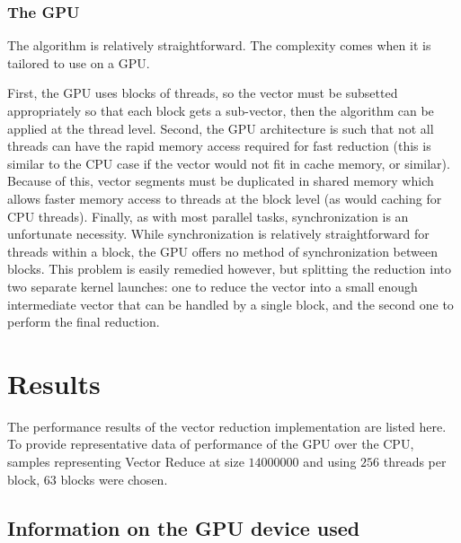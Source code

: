 \documentclass{article}
\begin{document}
\subsubsection{The GPU}
The algorithm is relatively straightforward. The complexity comes when it is tailored to use on a GPU.

First, the GPU uses blocks of threads, so the vector must be subsetted appropriately so that each block gets a sub-vector, then the algorithm can be applied at the thread level. Second, the GPU architecture is such that not all threads can have the rapid memory access required for fast reduction (this is similar to the CPU case if the vector would not fit in cache memory, or similar). Because of this, vector segments must be duplicated in shared memory which allows faster memory access to threads at the block level (as would caching for CPU threads). Finally, as with most parallel tasks, synchronization is an unfortunate necessity. While synchronization is relatively straightforward for threads within a block, the GPU offers no method of synchronization between blocks. This problem is easily remedied however, but splitting the reduction into two separate kernel launches: one to reduce the vector into a small enough intermediate vector that can be handled by a single block, and the second one to perform the final reduction.

\newpage
\section{Results}
The performance results of the vector reduction implementation are listed here. To provide representative data of performance of the GPU over the CPU, samples representing Vector Reduce at size $14000000$ and using $256$ threads per block, $63$ blocks were chosen.

\subsection{Information on the GPU device used}
\end{document}
